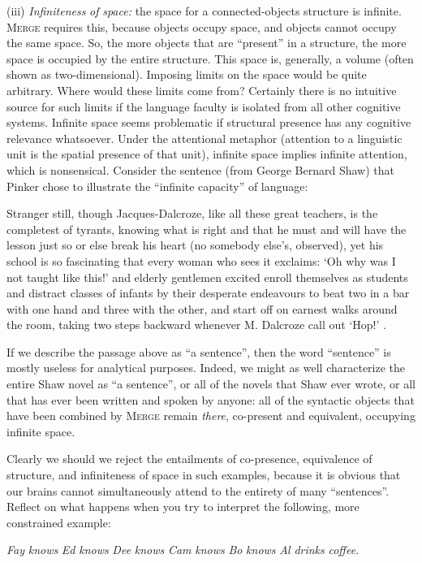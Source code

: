 (iii) \textit{Infiniteness} \textit{of} \textit{space:} the space for a connected-objects structure is infinite. \textsc{Merge} requires this, because objects occupy space, and objects cannot occupy the same space. So, the more objects that are “present” in a structure, the more space is occupied by the entire structure. This space is, generally, a volume (often shown as two-dimensional). Imposing limits on the space would be quite arbitrary. Where would these limits come from? Certainly there is no intuitive source for such limits if the language faculty is isolated from all other cognitive systems. Infinite space seems problematic if structural presence has any cognitive relevance whatsoever. Under the attentional metaphor (attention to a linguistic unit is the spatial presence of that unit), infinite space implies infinite attention, which is nonsensical. Consider the sentence (from George Bernard Shaw) that Pinker chose to illustrate the “infinite capacity” of language:

Stranger still, though Jacques-Dalcroze, like all these great teachers, is the completest of tyrants, knowing what is right and that he must and will have the lesson just so or else break his heart (no somebody else’s, observed), yet his school is so fascinating that every woman who sees it exclaims: ‘Oh why was I not taught like this!’ and elderly gentlemen excited enroll themselves as students and distract classes of infants by their desperate endeavours to beat two in a bar with one hand and three with the other, and start off on earnest walks around the room, taking two steps backward whenever M. Dalcroze call out ‘Hop!’ \citep{Pinker2003}.

  If we describe the passage above as “a sentence”, then the word “sentence” is mostly useless for analytical purposes. Indeed, we might as well characterize the entire Shaw novel as “a sentence”, or all of the novels that Shaw ever wrote, or all that has ever been written and spoken by anyone: all of the syntactic objects that have been combined by \textsc{Merge} remain \textit{there}, co-present and equivalent, occupying infinite space. 

  Clearly we should we reject the entailments of co-presence, equivalence of structure, and infiniteness of space in such examples, because it is obvious that our brains cannot simultaneously attend to the entirety of many “sentences”. Reflect on what happens when you try to interpret the following, more constrained example:

    \textit{Fay} \textit{knows} \textit{Ed} \textit{knows} \textit{Dee} \textit{knows} \textit{Cam} \textit{knows} \textit{Bo} \textit{knows} \textit{Al} \textit{drinks} \textit{coffee.}

